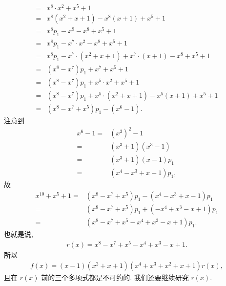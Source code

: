 \begin{example}
\begin{align*}
        = {} & x^8 \cdot x^2 + x^5 + 1                                               \\
        = {} & x^8 (x^2 + x + 1) - x^8 (x + 1) + x^5 + 1                             \\
        = {} & x^8 p_1 - x^9 - x^8 + x^5 + 1                                         \\
        = {} & x^8 p_1 - x^7 \cdot x^2 - x^8 + x^5 + 1                               \\
        = {} & x^8 p_1 - x^7 \cdot (x^2 + x + 1) + x^7 \cdot (x + 1) - x^8 + x^5 + 1 \\
        = {} & (x^8 - x^7) p_1 + x^7 + x^5 + 1                                       \\
        = {} & (x^8 - x^7) p_1 + x^5 \cdot x^2 + x^5 + 1                             \\
        = {} & (x^8 - x^7) p_1 + x^5 \cdot (x^2 + x + 1) - x^5 (x + 1) + x^5 + 1     \\
        = {} & (x^8 - x^7 + x^5) p_1 - (x^6 - 1).
    \end{align*}
    注意到
    \begin{align*}
        x^6 - 1
        = {} & (x^3)^2 - 1              \\
        = {} & (x^3 + 1) (x^3 - 1)      \\
        = {} & (x^3 + 1) (x - 1) p_1    \\
        = {} & (x^4 - x^3 + x - 1) p_1,
    \end{align*}
    故
    \begin{align*}
        x^{10} + x^5 + 1
        = {} & (x^8 - x^7 + x^5) p_1 - (x^4 - x^3 + x - 1) p_1  \\
        = {} & (x^8 - x^7 + x^5) p_1 + (-x^4 + x^3 - x + 1) p_1 \\
        = {} & (x^8 - x^7 + x^5 - x^4 + x^3 - x + 1) p_1.
    \end{align*}
    也就是说,
    \begin{align*}
        r(x) = x^8 - x^7 + x^5 - x^4 + x^3 - x + 1.
    \end{align*}
    所以
    \begin{align*}
        f(x) = (x-1) (x^2+x+1) (x^4+x^3+x^2+x+1) r(x),
    \end{align*}
    且在 $r(x)$ 前的三个多项式都是不可约的. 我们还要继续研究 $r(x)$.


\end{example}
